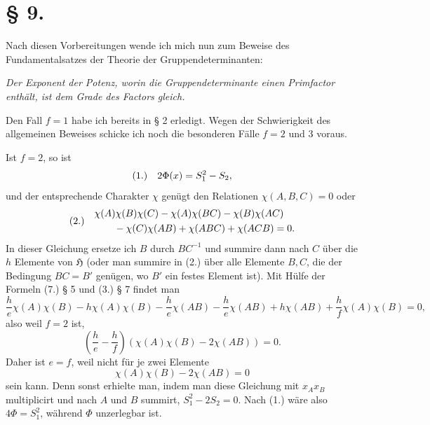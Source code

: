 \documentclass[11pt]{article}
\makeatletter
\newcommand{\Hgrp}{\mathfrak{H}}
\newcommand{\frobtagc}[2]{\[\begin{array}{@{}r@{\quad}c@{}}\textup{(#1)} & \displaystyle #2\end{array}\]}
\makeatother
\begin{document}
\section*{§ 9.}

Nach diesen Vorbereitungen wende ich mich nun zum Beweise des Fundamentalsatzes der Theorie der Gruppendeterminanten:

\emph{Der Exponent der Potenz, worin die Gruppendeterminante einen Primfactor enthält, ist dem Grade des Factors gleich.}

Den Fall $f=1$ habe ich bereits in § 2 erledigt. Wegen der Schwierigkeit des allgemeinen Beweises schicke ich noch die besonderen Fälle $f=2$ und 3 voraus.

Ist $f=2$, so ist
\frobtagc{1.}{2\Phi(x)=S_1^2-S_2,}
und der entsprechende Charakter $\chi$ genügt den Relationen $\chi(A,B,C)=0$ oder
\frobtagc{2.}{\begin{aligned}
&\chi(A)\chi(B)\chi(C)-\chi(A)\chi(BC)-\chi(B)\chi(AC)\nobreak\\
&\qquad{}-\chi(C)\chi(AB)+\chi(ABC)+\chi(ACB)=0.
\end{aligned}}
In dieser Gleichung ersetze ich $B$ durch $BC^{-1}$ und summire dann nach $C$ über die $h$ Elemente von $\Hgrp$ (oder man summire in (2.) über alle Elemente $B,C$, die der Bedingung $BC=B'$ genügen, wo $B'$ ein festes Element ist). Mit Hülfe der Formeln (7.) § 5 und (3.) § 7 findet man
\[
\frac{h}{e}\chi(A)\chi(B)-h\chi(A)\chi(B)-\frac{h}{e}\chi(AB)-\frac{h}{e}\chi(AB)+h\chi(AB)+\frac{h}{f}\chi(A)\chi(B)=0,
\]
also weil $f=2$ ist,
\[
\left(\frac{h}{e}-\frac{h}{f}\right)(\chi(A)\chi(B)-2\chi(AB))=0.
\]
Daher ist $e=f$, weil nicht für je zwei Elemente
\[
\chi(A)\chi(B)-2\chi(AB)=0
\]
sein kann. Denn sonst erhielte man, indem man diese Gleichung mit $x_Ax_B$ multiplicirt und nach $A$ und $B$ summirt, $S_1^2-2S_2=0$. Nach (1.) wäre also $4\Phi=S_1^2$, während $\Phi$ unzerlegbar ist.
\end{document}
